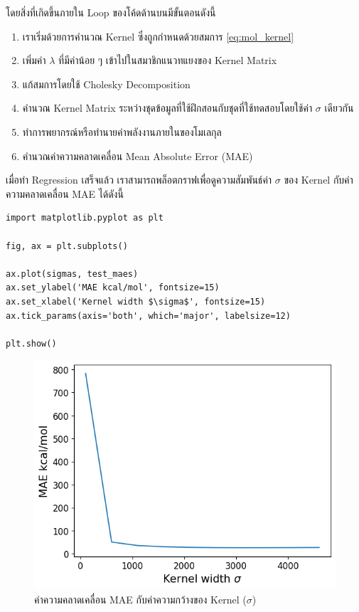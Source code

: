 โดยสิ่งที่เกิดขึ้นภายใน Loop ของโค้ดด้านบนมีขั้นตอนดังนี้

\begin{enumerate}[noitemsep]
    \item เราเริ่มด้วยการคำนวณ Kernel ซึ่งถูกกำหนดด้วยสมการ \ref{eq:mol_kernel}
    
    \item เพิ่มค่า $\lambda$ ที่มีค่าน้อย ๆ เข้าไปในสมาชิกแนวทแยงของ Kernel Matrix
    
    \item แก้สมการโดยใช้ Cholesky Decomposition
    
    \item คำนวณ Kernel Matrix ระหว่างชุดข้อมูลที่ใช้ฝึกสอนกับชุดที่ใช้ทดสอบโดยใช้ค่า $\sigma$ เดียวกัน
    
    \item ทำการพยากรณ์หรือทำนายค่าพลังงานภายในของโมเลกุล
    
    \item คำนวณค่าความคลาดเคลื่อน Mean Absolute Error (MAE)
\end{enumerate}

เมื่อทำ Regression เสร็จแล้ว เราสามารถพล็อตกราฟเพื่อดูความสัมพันธ์ค่า $\sigma$ ของ Kernel กับค่าความคลาดเคลื่อน MAE ได้ดังนี้

\begin{lstlisting}[style=MyPython]
import matplotlib.pyplot as plt

fig, ax = plt.subplots()

ax.plot(sigmas, test_maes)
ax.set_ylabel('MAE kcal/mol', fontsize=15)
ax.set_xlabel('Kernel width $\sigma$', fontsize=15)
ax.tick_params(axis='both', which='major', labelsize=12)

plt.show()
\end{lstlisting}

\begin{figure}[H]
    \centering
    \includegraphics[width=0.9\linewidth]{fig/qm9_cm_mae_sigma.png}
    \caption{ค่าความคลาดเคลื่อน MAE กับค่าความกว้างของ Kernel ($\sigma$)}
    \label{fig:qm9_cm_kernel_mae}
\end{figure}

